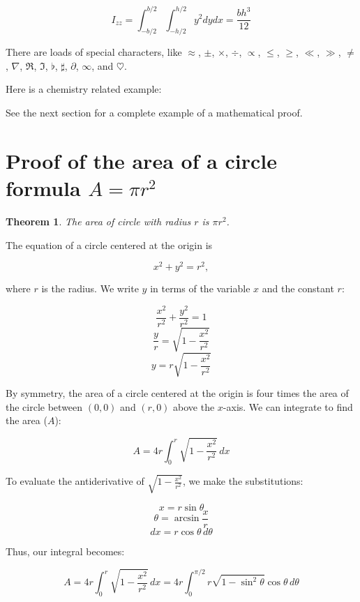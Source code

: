 \begin{equation}
  I_{zz} = \int_{-b/2}^{b/2} \int_{-h/2}^{h/2} y^2 dy dx = \frac{b h^3}{12}
  \label{eq:mom-inert}
\end{equation}

There are loads of special characters, like $\approx$, $\pm$,
$\times$, $\div$, $\propto$, $\leq$, $\geq$, $\ll$, $\gg$, $\neq$,
$\nabla$, $\Re$, $\Im$, $\flat$, $\sharp$, $\partial$, $\infty$, and $\heartsuit$.

Here is a chemistry related example:

\begin{center}
\end{center}


See the next section for a complete example of a mathematical proof.

\section{Proof of the area of a circle formula $A = \pi r^2$}
\newtheorem{prf}{Theorem}


\begin{prf}
The area of circle with radius $r$ is $\pi r^2$.
\end{prf}

 The equation of a circle centered at the
origin is

$$
x^2 + y^2 = r^2,
$$

\noindent where $r$ is the radius.  We  write $y$ in terms of the
variable $x$ and the constant $r$:

$$
\frac{x^2}{r^2} + \frac{y^2}{r^2} = 1
$$
$$
\frac{y}{r} = \sqrt{1-\frac{x^2}{r^2}}
$$
$$
y= r\sqrt {1-\frac{x^2}{r^2}}
$$

By symmetry, the area of a circle centered at the origin is four
times the area of the circle between $(0,0)$ and $(r, 0)$ above the
$x$-axis.  We can integrate to find the area ($A$):

$$
A = 4r\int_0^r \sqrt {1-\frac{x^2}{r^2}}\, dx
$$

To evaluate the antiderivative of $\displaystyle\sqrt
{1-\frac{x^2}{r^2}}$, we make the substitutions:

$$
x = r \sin \theta
$$
$$
\theta = \arcsin \frac{x}{r}
$$
$$
dx = r\cos \theta\, d\theta
$$

Thus, our integral becomes:

$$
A=4r\int_0^r \sqrt {1-\frac{x^2}{r^2}}\, dx = 4r\int_0^{\pi/2}
r\sqrt{1-\sin^2 \theta} \cos \theta\, d\theta
$$

